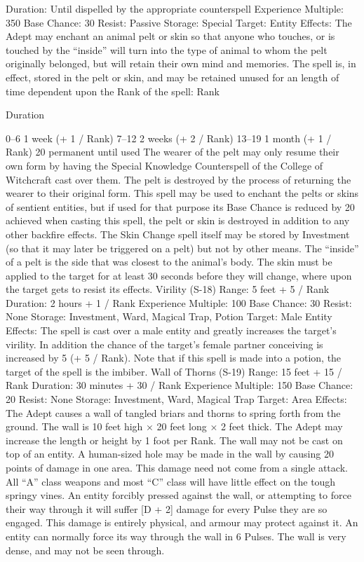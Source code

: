 \documentclass[a4paper]{article}
\begin{document}
\begin{multicols}{3}
Duration: Until dispelled by the appropriate counterspell
Experience Multiple: 350
Base Chance: 30%
Resist: Passive
Storage: Special
Target: Entity
Effects: The Adept may enchant an animal pelt or
skin so that anyone who touches, or is touched by
the “inside” will turn into the type of animal to
whom the pelt originally belonged, but will retain
their own mind and memories. The spell is, in
effect, stored in the pelt or skin, and may be retained unused for an length of time dependent upon
the Rank of the spell:
Rank

Duration

0–6
1 week (+ 1 / Rank)
7–12
2 weeks (+ 2 / Rank)
13–19 1 month (+ 1 / Rank)
20
permanent until used
The wearer of the pelt may only resume their own
form by having the Special Knowledge Counterspell of the College of Witchcraft cast over them.
The pelt is destroyed by the process of returning
the wearer to their original form. This spell may be
used to enchant the pelts or skins of sentient entities, but if used for that purpose its Base Chance is
reduced by 20%
achieved when casting this spell, the pelt or skin is
destroyed in addition to any other backfire effects.
The Skin Change spell itself may be stored by
Investment (so that it may later be triggered on a
pelt) but not by other means. The “inside” of a pelt
is the side that was closest to the animal’s body.
The skin must be applied to the target for at least
30 seconds before they will change, where upon
the target gets to resist its effects.
Virility (S-18)
Range: 5 feet + 5 / Rank
Duration: 2 hours + 1 / Rank
Experience Multiple: 100
Base Chance: 30%
Resist: None
Storage: Investment, Ward, Magical Trap, Potion
Target: Male Entity
Effects: The spell is cast over a male entity and
greatly increases the target’s virility. In addition
the chance of the target’s female partner conceiving is increased by 5 (+ 5 / Rank). Note that if this
spell is made into a potion, the target of the spell is
the imbiber.
Wall of Thorns (S-19)
Range: 15 feet + 15 / Rank
Duration: 30 minutes + 30 / Rank
Experience Multiple: 150
Base Chance: 20%
Resist: None
Storage: Investment, Ward, Magical Trap
Target: Area
Effects: The Adept causes a wall of tangled briars
and thorns to spring forth from the ground. The
wall is 10 feet high × 20 feet long × 2 feet thick.
The Adept may increase the length or height by 1
foot per Rank. The wall may not be cast on top of
an entity. A human-sized hole may be made in the
wall by causing 20 points of damage in one area.
This damage need not come from a single attack.
All “A” class weapons and most “C” class will
have little effect on the tough springy vines. An
entity forcibly pressed against the wall, or attempting to force their way through it will suffer [D + 2]
damage for every Pulse they are so engaged. This
damage is entirely physical, and armour may protect against it. An entity can normally force its way
through the wall in 6 Pulses. The wall is very
dense, and may not be seen through.


\end{multicols}
\end{document}
